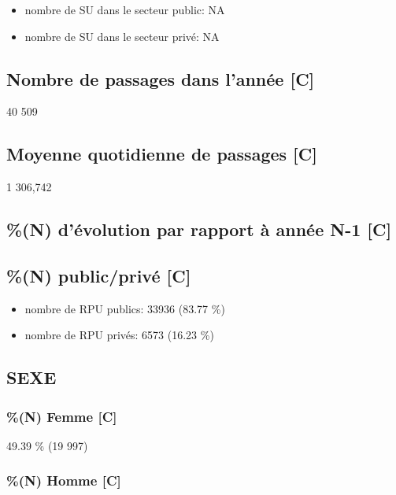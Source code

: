\documentclass[]{article}
\begin{document}
\begin{itemize}
\itemsep1pt\parskip0pt
\item
  nombre de SU dans le secteur public: NA
\item
  nombre de SU dans le secteur privé: NA
\end{itemize}

\subsection{Nombre de passages dans l'année
{[}C{]}}\label{nombre-de-passages-dans-lannee-c}

40 509

\subsection{Moyenne quotidienne de passages
{[}C{]}}\label{moyenne-quotidienne-de-passages-c}

1 306,742

\subsection{\%(N) d'évolution par rapport à année N-1
{[}C{]}}\label{n-devolution-par-rapport-a-annee-n-1-c}

\subsection{\%(N) public/privé {[}C{]}}\label{n-publicprive-c}

\begin{itemize}
\itemsep1pt\parskip0pt
\item
  nombre de RPU publics: 33936 (83.77 \%)
\item
  nombre de RPU privés: 6573 (16.23 \%)
\end{itemize}

\subsection{SEXE}\label{sexe}

\subsubsection{\%(N) Femme {[}C{]}}\label{n-femme-c}

49.39 \% (19 997)

\subsubsection{\%(N) Homme {[}C{]}}\label{n-homme-c}
\end{document}
